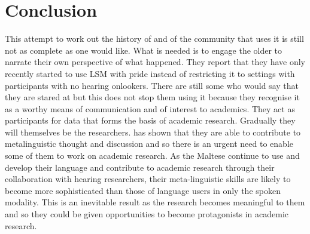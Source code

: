 \documentclass[output=paper]{langsci/langscibook}
\begin{document}
\section{Conclusion}

This attempt to work out the history of  and of
the community that uses it is still not as complete as one would like.
What is needed is to engage the older  to narrate their own
perspective of what happened.  They report that they have only
recently started to use LSM with pride instead of restricting it to
settings with  participants with no hearing onlookers.  There are
still some who would say that they are stared at but this does not
stop them using it because they recognise it as a worthy means of
communication and of interest to academics.  They act as participants
for data that forms the basis of academic research.  Gradually they
will themselves be the researchers.  \citet{g14} has shown that
they are able to contribute to metalinguistic thought and discussion
and so there is an urgent need to enable some of them to work on
academic research.  As the Maltese  continue to use and develop
their language and contribute to academic research through their
collaboration with hearing researchers, their meta-linguistic skills
are likely to become more sophisticated than those of language users
in only the spoken modality.  This is an inevitable result as the
research becomes meaningful to them and so they could be given
opportunities to become protagonists in academic research.

 
 
 
 

\sloppy
\printbibliography[heading=subbibliography,notkeyword=this] 
\end{document}
